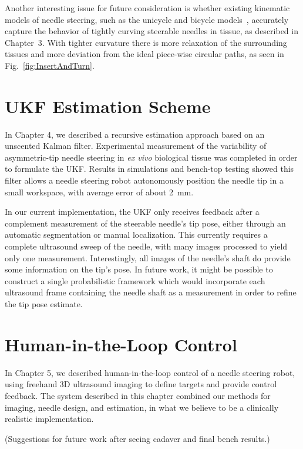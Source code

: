 Another interesting issue for future consideration is whether existing kinematic models of needle steering, such as the unicycle and bicycle models~\cite{Park2005,Webster2006}, accurately capture the behavior of tightly curving steerable needles in tissue, as described in Chapter~3. With tighter curvature there is more relaxation of the surrounding tissues and more deviation from the ideal piece-wise circular paths, as seen in Fig.~\ref{fig:InsertAndTurn}.

\section{UKF Estimation Scheme}
In Chapter 4, we described a recursive estimation approach based on an unscented Kalman filter. Experimental measurement of the variability of asymmetric-tip needle steering in \textit{ex vivo} biological tissue was completed in order to formulate the UKF. Results in simulations and bench-top testing showed this filter allows a needle steering robot autonomously position the needle tip in a small workspace, with average error of about 2~mm.

In our current implementation, the UKF only receives feedback after a complement measurement of the steerable needle's tip pose, either through an automatic segmentation or manual localization. This currently requires a complete ultrasound sweep of the needle, with many images processed to yield only one measurement. Interestingly, all images of the needle's shaft do provide some information on the tip's pose. In future work, it might be possible to construct a single probabilistic framework which would incorporate each ultrasound frame containing the needle shaft as a measurement in order to refine the tip pose estimate.

\section{Human-in-the-Loop Control} 
In Chapter 5, we described human-in-the-loop control of a needle steering robot, using freehand 3D ultrasound imaging to define targets and provide control feedback. The system described in this chapter combined our methods for imaging, needle design, and estimation, in what we believe to be a clinically realistic implementation. 

(Suggestions for future work after seeing cadaver and final bench results.)
